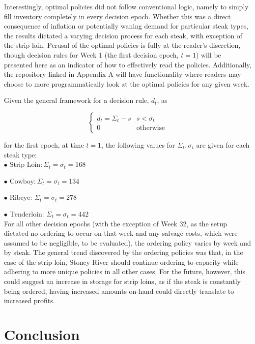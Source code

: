 \documentclass[12pt,a4paper]{article}
\begin{document}
Interestingly, optimal policies did not follow conventional logic, namely to simply fill inventory completely in every decision epoch. Whether this was a direct consequence of inflation or potentially waning demand for particular steak types, the results dictated a varying decision process for each steak, with exception of the strip loin. Perusal of the optimal policies is fully at the reader's discretion, though decision rules for Week 1 (the first decision epoch, $t = 1$) will be presented here as an indicator of how to effectively read the policies. Additionally, the repository linked in Appendix A will have functionality where readers may choose to more programmatically look at the optimal policies for any given week.

Given the general framework for a decision rule, $d_{t}$, as 

\begin{equation}
\begin{cases}
d_{t} = \Sigma_{t} - s & s < \sigma_{t} \\ 0 & \text{otherwise} 
\end{cases}
\end{equation}

for the first epoch, at time $t = 1$, the following values for $\Sigma_{t}, \sigma_{t}$ are given for each steak type:
\\

$ \bullet \text{ Strip Loin}: \Sigma_{t} = \sigma_{t} = 168$ 

$ \bullet \text{ Cowboy}: \Sigma_{t} = \sigma_{t} = 134$

$ \bullet \text{ Ribeye: } \Sigma_{t} = \sigma_{t} = 278  $

$ \bullet \text{ Tenderloin: } \Sigma_{t} = \sigma_{t} = 442  $
\\

For all other decision epochs (with the exception of Week 32, as the setup dictated no ordering to occur on that week and any salvage costs, which were assumed to be negligible, to be evaluated), the ordering policy varies by week and by steak. The general trend discovered by the ordering policies was that, in the case of the strip loin, Stoney River should continue ordering to-capacity while adhering to more unique policies in all other cases. For the future, however, this could suggest an increase in storage for strip loins, as if the steak is constantly being ordered, having increased amounts on-hand could directly translate to increased profits.

\section{Conclusion}
\end{document}
